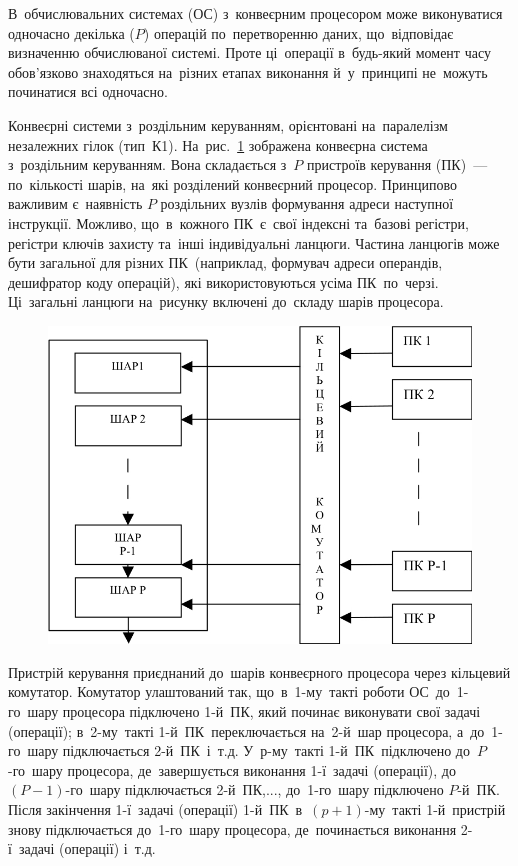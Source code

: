 \documentclass[
	a4paper,
	oneside,
	BCOR = 10mm,
	DIV = 12,
	12pt,
	headings = normal,
]{scrartcl}
\begin{document}
		В~обчислювальних системах (ОС) з~конвеєрним процесором може виконуватися одночасно декілька ($P$) операцій по~перетворенню даних, що~відповідає визначенню обчислюваної системі. Проте ці~операції в~будь-який момент часу обов’язково знаходяться на~різних етапах виконання й~у~принципі не~можуть починатися всі одночасно.

		Конвеєрні системи з~роздільним керуванням, орієнтовані на~паралелізм незалежних гілок (тип~К1). На~рис.~\ref{fig:mpp-t01} зображена конвеєрна система з~роздільним керуванням. Вона складається з~$P$ пристроїв керування (ПК)~— по~кількості шарів, на~які розділений конвеєрний процесор. Принципово важливим є~наявність $P$ роздільних вузлів формування адреси наступної інструкції. Можливо, що~в~кожного ПК~є~свої індексні та~базові регістри, регістри ключів захисту та~інші індивідуальні ланцюги. Частина ланцюгів може бути загальної для різних ПК~(наприклад, формувач адреси операндів, дешифратор коду операцій), які використовуються усіма ПК~по~черзі. Ці~загальні ланцюги на~рисунку включені до~складу шарів процесора.

		\begin{figure}[!htbp]
			\centering
			\includegraphics[height=9\baselineskip]{./assets/y03s02-compsys-lab-05-p01-mpp-t01.jpg}
			\caption{}
			\label{fig:mpp-t01}
		\end{figure}

		Пристрій керування приєднаний до~шарів конвеєрного процесора через кільцевий комутатор. Комутатор улаштований так, що~в~1-му~такті роботи ОС~до~1-го~шару процесора підключено 1-й~ПК, який починає виконувати свої задачі (операції); в~2-му~такті 1-й~ПК~переключається на~2-й~шар процесора, а~до~1-го~шару підключається 2-й~ПК~і~т.д. У~р-му~такті 1-й~ПК~підключено до~$P$-го~шару процесора, де~завершується виконання 1-ї~задачі (операції), до~$(P-1)$-го~шару підключається 2-й~ПК,..., до~1-го~шару підключено $P$-й~ПК. Після закінчення 1-ї~задачі (операції) 1-й~ПК~в~$(p+1)$-му~такті 1-й~пристрій знову підключається до~1-го~шару процесора, де~починається виконання 2-ї~задачі (операції) і~т.д.
\end{document}
